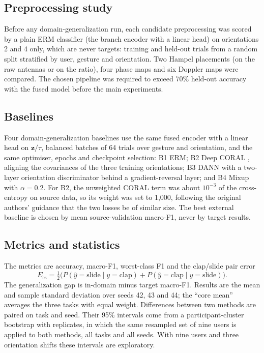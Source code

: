 \documentclass[conference]{IEEEtran}
\begin{document}
\subsection{Preprocessing study}\label{sec:gate}
Before any domain-generalization run, each candidate preprocessing was scored by a plain ERM classifier (the branch encoder with a linear head) on orientations 2 and 4 only, which are never targets: \GateNtrain{} training and \GateNheld{} held-out trials from a random split stratified by user, gesture and orientation. Two Hampel placements (on the raw antennas or on the ratio), four phase maps and six Doppler maps were compared. The chosen pipeline was required to exceed 70\% held-out accuracy with the fused model before the main experiments.

\subsection{Baselines}
Four domain-generalization baselines use the same fused encoder with a linear head on $\mathbf{z}/\tau$, balanced batches of 64 trials over gesture and orientation, and the same optimiser, epochs and checkpoint selection: B1 ERM; B2 Deep CORAL \cite{sun2016coral}, aligning the covariances of the three training orientations; B3 DANN \cite{ganin2015dann} with a two-layer orientation discriminator behind a gradient-reversal layer; and B4 Mixup \cite{zhang2018mixup} with $\alpha=0.2$. For B2, the unweighted CORAL term was about $10^{-3}$ of the cross-entropy on source data, so its weight was set to 1,000, following the original authors' guidance that the two losses be of similar size. The best external baseline is chosen by mean source-validation macro-F1, never by target results.

\subsection{Metrics and statistics}
The metrics are accuracy, macro-F1, worst-class F1 and the clap/slide pair error
\begin{equation}
E_{\mathrm{cs}}=\tfrac{1}{2}\bigl(P(\hat y=\text{slide}\mid y=\text{clap})+P(\hat y=\text{clap}\mid y=\text{slide})\bigr).
\end{equation}
The generalization gap is in-domain minus target macro-F1. Results are the mean and sample standard deviation over seeds 42, 43 and 44; the ``core mean'' averages the three tasks with equal weight. Differences between two methods are paired on task and seed. Their 95\% intervals come from a participant-cluster bootstrap \cite{efron1993bootstrap} with \NBoot{} replicates, in which the same resampled set of nine users is applied to both methods, all tasks and all seeds. With nine users and three orientation shifts these intervals are exploratory.
\end{document}
